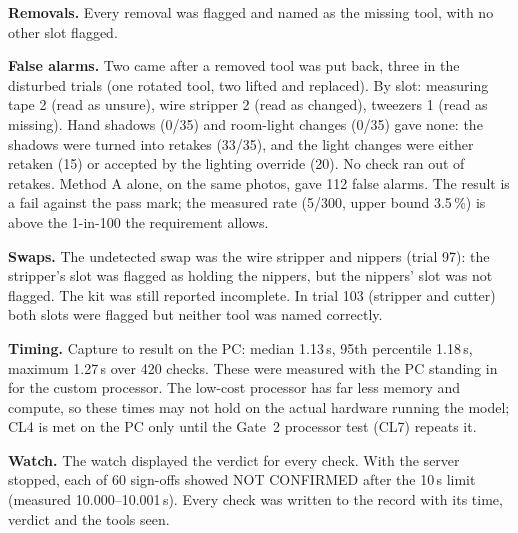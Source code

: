 \textbf{Removals.} Every removal was flagged and named as the missing tool,
with no other slot flagged.

\textbf{False alarms.} Two came after a removed tool was put back, three in
the disturbed trials (one rotated tool, two lifted and replaced). By slot:
measuring tape 2 (read as unsure), wire stripper 2 (read as changed),
tweezers 1 (read as missing). Hand shadows (0/35) and room-light changes
(0/35) gave none: the shadows were turned into retakes (33/35), and the
light changes were either retaken (15) or accepted by the lighting
override (20). No check ran out of retakes. Method A alone, on the same
photos, gave 112 false alarms.
The result is a fail against the pass mark; the measured rate (5/300,
upper bound 3.5\,\%) is above the 1-in-100 the requirement allows.

\textbf{Swaps.} The undetected swap was the wire stripper and nippers
(trial 97): the stripper's slot was flagged as holding the nippers, but the
nippers' slot was not flagged. The kit was still reported incomplete. In
trial 103 (stripper and cutter) both slots were flagged but neither tool
was named correctly.

\textbf{Timing.} Capture to result on the PC: median 1.13\,s, 95th
percentile 1.18\,s, maximum 1.27\,s over 420 checks. These were measured
with the PC standing in for the custom processor. The low-cost processor
has far less memory and compute, so these times may not hold on the actual
hardware running the model; CL4 is met on the PC only until the Gate~2
processor test (CL7) repeats it.

\textbf{Watch.} The watch displayed the verdict for every check. With the
server stopped, each of 60 sign-offs showed NOT CONFIRMED after the 10\,s
limit (measured 10.000--10.001\,s). Every check was written to the
record with its time, verdict and the tools seen.

